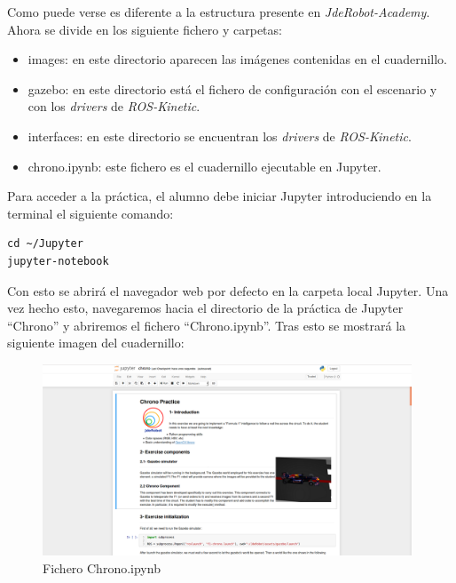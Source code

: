 Como puede verse es diferente a la estructura presente en \textit{JdeRobot-Academy}. Ahora se divide en los siguiente fichero y carpetas:

\begin{itemize}
    \item images: en este directorio aparecen las imágenes contenidas en el cuadernillo.
    \item gazebo: en este directorio está el fichero de configuración con el escenario y con los \textit{drivers} de \textit{ROS-Kinetic}.
    \item interfaces: en este directorio se encuentran los \textit{drivers} de \textit{ROS-Kinetic}.
    \item chrono.ipynb: este fichero es el cuadernillo ejecutable en Jupyter.
\end{itemize}

Para acceder a la práctica, el alumno debe iniciar Jupyter introduciendo en la terminal el siguiente comando:

\lstset{language=bash, breaklines=true, basicstyle=\footnotesize}
\begin{lstlisting}[frame=single]
cd ~/Jupyter
jupyter-notebook
\end{lstlisting}

Con esto se abrirá el navegador web por defecto en la carpeta local Jupyter. Una vez hecho esto, navegaremos hacia el directorio de la práctica de Jupyter ``Chrono'' y abriremos el fichero ``Chrono.ipynb''. Tras esto se mostrará la siguiente imagen del cuadernillo:

\begin{figure}[H]
  \begin{center}
    \includegraphics[width=0.98\textwidth]{figures/ipynb_chrono.png}
		\caption{Fichero Chrono.ipynb}
		\label{fig.fcipynb}
		\end{center}
\end{figure}

